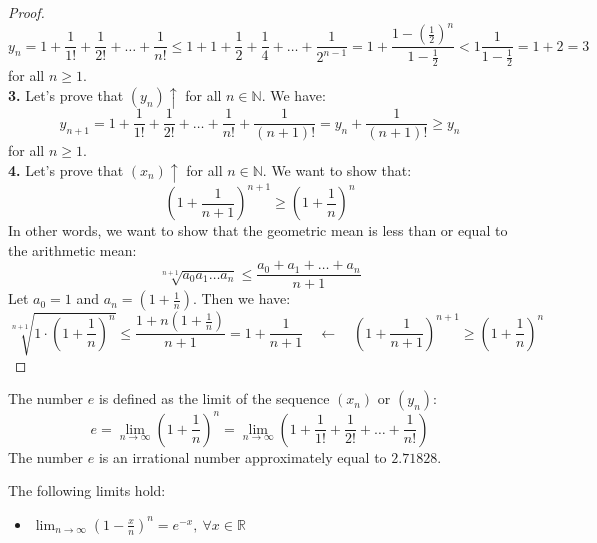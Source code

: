 \begin{proof}
    \[ y_n = 1 + \frac{1}{1!} + \frac{1}{2!} + \ldots + \frac{1}{n!} \leq 1 + 1 + \frac{1}{2} + \frac{1}{4} + \ldots + \frac{1}{2^{n - 1}} = 1 + \frac{1- (\frac{1}{2})^n}{1 - \frac{1}{2}} < 1 \frac{1}{1 - \frac{1}{2}} = 1 + 2 = 3 \]
    for all \( n \geq 1 \). \\
    \textbf{3.} Let's prove that \( (y_n) \uparrow \) for all \( n \in \mathbb{N} \). We have:
    \[
        y_{n + 1} = 1 + \frac{1}{1!} + \frac{1}{2!} + \ldots + \frac{1}{n!} + \frac{1}{(n + 1)!} = y_n + \frac{1}{(n + 1)!} \geq y_n
    \]
    for all \( n \geq 1 \). \\
    \textbf{4.} Let's prove that \( (x_n) \uparrow \) for all \( n \in \mathbb{N} \). We want to show that:
    \[
        \left(1 + \frac{1}{n + 1}\right)^{n + 1} \geq \left(1 + \frac{1}{n}\right)^n
    \]
    In other words, we want to show that the geometric mean is less than or equal to the arithmetic mean:
    \[
        \sqrt[n + 1]{a_0 a_1 \ldots a_n} \leq \frac{a_0 + a_1 + \ldots + a_n}{n + 1}
    \]
    Let $a_0 = 1$ and $a_n = \left(1 + \frac{1}{n}\right)$. Then we have:
    \[
        \sqrt[n + 1]{1 \cdot \left(1 + \frac{1}{n}\right)^n} \leq \frac{1 + n\left(1 + \frac{1}{n}\right)}{n + 1} = 1 + \frac{1}{n + 1} \quad \leftarrow \quad \left(1 + \frac{1}{n + 1}\right)^{n + 1} \geq \left(1 + \frac{1}{n}\right)^n
    \]
\end{proof}

\begin{definition}
    The number \( e \) is defined as the limit of the sequence \( (x_n) \) or \( (y_n) \):
    \[
        e = \lim_{n \to \infty} \left(1 + \frac{1}{n}\right)^n = \lim_{n \to \infty} \left(1 + \frac{1}{1!} + \frac{1}{2!} + \ldots + \frac{1}{n!}\right)
    \]
    The number \( e \) is an irrational number approximately equal to \( 2.71828 \).
\end{definition}
The following limits hold:
\begin{itemize}[itemsep=1pt,label=$\circ$]
    \item $\lim_{n \to \infty} \left(1 - \frac{x}{n}\right)^n = e^{-x}, \ \forall x \in \mathbb{R}$
\end{itemize}

